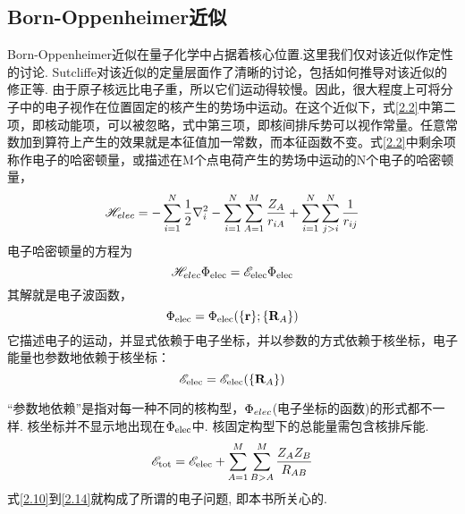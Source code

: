 \subsection{Born-Oppenheimer近似}
\label{sec2.1.2}
Born-Oppenheimer近似在量子化学中占据着核心位置.这里我们仅对该近似作定性的讨论. Sutcliffe对该近似的定量层面作了清晰的讨论，包括如何推导对该近似的修正等. 由于原子核远比电子重，所以它们运动得较慢。因此，很大程度上可将分子中的电子视作在位置固定的核产生的势场中运动。在这个近似下，式\ref{2.2}中第二项，即核动能项，可以被忽略，式中第三项，即核间排斥势可以视作常量。任意常数加到算符上产生的效果就是本征值加一常数，而本征函数不变。式\ref{2.2}中剩余项称作电子的哈密顿量，或描述在M个点电荷产生的势场中运动的N个电子的哈密顿量，
\begin{equation}
\label{2.10}
\mathscr{H}_{elec}=-\sum_{i=1}^{N}\frac{1}{2}\nabla_i^2 - \sum_{i=1}^{N}\sum_{A=1}^{M}\frac{Z_A}{r_{iA}} + \sum_{i=1}^{N}\sum_{j>i}^{N}\frac{1}{r_{ij}}
\end{equation}
电子哈密顿量的\sch 方程为
\begin{equation}
\label{2.11}
\mathscr{H}_{elec\rm}\Phi_{\rm elec}=\mathscr{E}_{\rm elec}\Phi_{\rm elec}
\end{equation}
其解就是电子波函数，
\begin{equation}
\label{2.12}
\Phi_{\rm elec}=\Phi_{\rm elec}(\{\mathbf{r}\};\{\mathbf{R}_A\})
\end{equation}
它描述电子的运动，并显式依赖于电子坐标，并以参数的方式依赖于核坐标，电子能量也参数地依赖于核坐标：
\begin{equation}
\label{2.13}
\mathscr{E}_{\rm elec}=\mathscr{E}_{\rm elec}(\{\mathbf{R}_A\})
\end{equation}

“参数地依赖”是指对每一种不同的核构型，$\Phi_{elec\rm}$(电子坐标的函数)的形式都不一样. 核坐标并不显示地出现在$\Phi_{\rm elec}$中. 核固定构型下的总能量需包含核排斥能.
\begin{equation}
\label{2.14}
\mathscr{E}_{\rm tot}=\mathscr{E}_{\rm elec}+\sum_{A=1}^{M}\sum_{B>A}^M\frac{Z_AZ_B}{R_{AB}}
\end{equation}
式\ref{2.10}到\ref{2.14}就构成了所谓的电子问题, 即本书所关心的.

